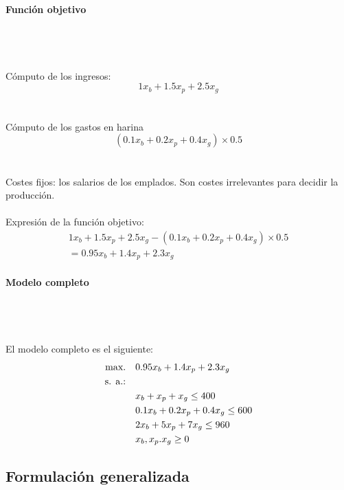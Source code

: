 \paragraph{Función objetivo}\mbox{}\\
\\
\\
Cómputo de los ingresos:
\begin{equation}
1x_b + 1.5x_p + 2.5x_g
\end{equation}
\\
\\
Cómputo de los gastos en harina
\begin{equation}
(0.1x_b + 0.2x_p + 0.4x_g)\times0.5
\end{equation}
\\
\\
Costes fijos: los salarios de los emplados. Son costes irrelevantes para decidir la producción.
\\
\\
Expresión de la función objetivo:
\begin{equation}
\begin{split}
1x_b + 1.5x_p + 2.5x_g - (0.1x_b + 0.2x_p + 0.4x_g)\times0.5 \\
= 0.95x_b + 1.4x_p + 2.3x_g 
\end{split}
\end{equation}

\paragraph{Modelo completo}\mbox{}\\
\\
\\
El modelo completo es el siguiente:
\begin{align}
\mbox{max.} \quad & 0.95x_b + 1.4x_p + 2.3x_g \notag \\
\mbox{s. a.:} \quad &  \notag \\		
             & x_b + x_p + x_g \leq 400 \notag \\
             &  0.1x_b + 0.2x_p + 0.4x_g \leq 600\notag \\
             & 2x_b + 5x_p + 7x_g \leq 960\notag  \\
             & x_b, x_p. x_g \geq 0
\end{align}    

\subsection{Formulación generalizada}

